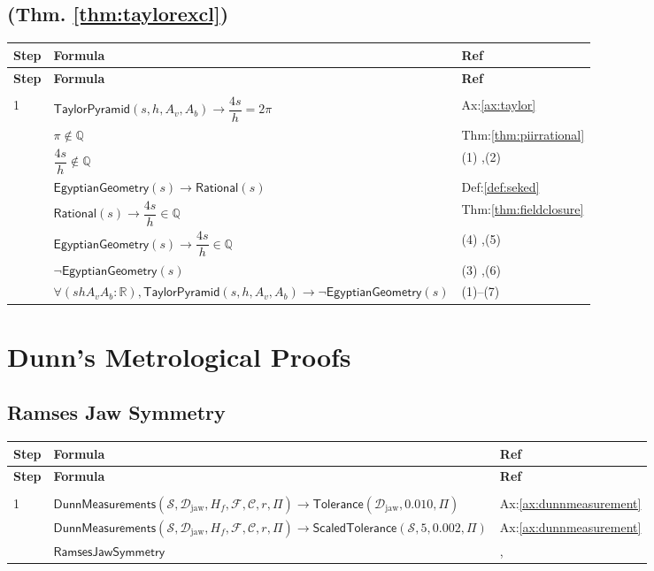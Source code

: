 \documentclass[12pt]{amsart}
\newcommand{\br}{,\allowbreak}
\newenvironment{prooftable}{%
	\renewcommand{\arraystretch}{1.2}%
	\setlength{\tabcolsep}{4pt}%
	\setlength{\arrayrulewidth}{0.05pt}
	\tiny
	\sloppy
	\begin{longtable}{
			|>{\centering\arraybackslash}m{0.7cm}|
			>{\raggedright\centering\arraybackslash}m{0.70\textwidth}|
			>{\centering\arraybackslash}m{3.5cm}|  %
		}%
		\hline
		\textbf{Step} & \centering\textbf{Formula} & \textbf{Ref} \\
		\hline
		\endfirsthead
		\hline
		\textbf{Step} & \centering\textbf{Formula} & \textbf{Ref} \\
		\hline
		\endhead
		\hline
		\multicolumn{3}{r}{\textit{Continued on next page}} \\
		\endfoot
		\hline
		\endlastfoot
	}{%
	\end{longtable}%
}
\begin{document}
\subsection{(Thm. \ref{thm:taylorexcl})}
\begin{prooftable}
	1 & $\textsf{TaylorPyramid}(s \br h \br A_v \br A_b) \to \dfrac{4s}{h} = 2\pi$ & Ax:\ref{ax:taylor} \\[3pt] \hline
	2 & $\pi \notin \mathbb{Q}$ & Thm:\ref{thm:piirrational} \\[3pt] \hline
	3 & $\dfrac{4s}{h} \notin \mathbb{Q}$ & (1) \br (2) \\[3pt] \hline
	4 & $\textsf{EgyptianGeometry}(s) \to \textsf{Rational}(s)$ & Def:\ref{def:seked} \\[3pt] \hline
	5 & $\textsf{Rational}(s) \to \dfrac{4s}{h} \in \mathbb{Q}$ & Thm:\ref{thm:fieldclosure} \\[3pt] \hline
	6 & $\textsf{EgyptianGeometry}(s) \to \dfrac{4s}{h} \in \mathbb{Q}$ & (4) \br (5) \\[3pt] \hline
	7 & $\neg \textsf{EgyptianGeometry}(s)$ & (3) \br (6) \\[3pt] \hdashline
	& $\forall(s h A_v A_b : \mathbb{R}) \br  \textsf{TaylorPyramid}(s \br h \br A_v \br A_b) \to \neg \textsf{EgyptianGeometry}(s)$ & (1)--(7)
\end{prooftable}

\section{Dunn's Metrological Proofs}

\subsection{Ramses Jaw Symmetry}
\begin{prooftable}
	1 & $\textsf{DunnMeasurements}(\mathcal{S} \br  \mathcal{D}_{\text{jaw}} \br  H_f \br  \mathcal{F} \br  \mathcal{C} \br  r \br  \Pi) \to \textsf{Tolerance}(\mathcal{D}_{\text{jaw}} \br  0.010 \br  \Pi)$ & Ax:\ref{ax:dunnmeasurement} \\[3pt] \hline
	2 & $\textsf{DunnMeasurements}(\mathcal{S} \br  \mathcal{D}_{\text{jaw}} \br  H_f \br  \mathcal{F} \br  \mathcal{C} \br  r \br  \Pi) \to \textsf{ScaledTolerance}(\mathcal{S} \br  5 \br  0.002 \br  \Pi)$ & Ax:\ref{ax:dunnmeasurement} \\[3pt] \hdashline
	& $\textsf{RamsesJawSymmetry}$ & 1 \br 2
\end{prooftable}
\end{document}
